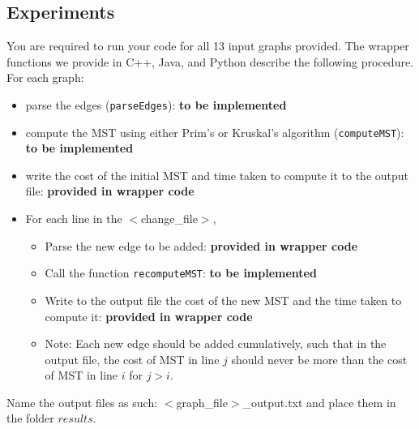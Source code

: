 \documentclass{article}
\begin{document}
\subsection{Experiments}\label{subsec:exp} You are required to run your code
for all 13 input graphs provided. The wrapper functions we provide in C++,
Java, and Python describe the following procedure. For each graph:
\begin{itemize}
\item parse the edges (\texttt{parseEdges}): {\bf to be implemented}
\item compute the MST using either Prim's or Kruskal's algorithm
(\texttt{computeMST}): {\bf to be implemented}
\item write the cost of the initial MST and time taken to compute it to the
output file: {\bf provided in wrapper code}
\item For each line in the $<$change\_file$>$,
    \begin{itemize}
    \item Parse the new edge to be added: {\bf provided in wrapper code}
    \item Call the function \texttt{recomputeMST}: {\bf to be implemented}
    \item Write to the output file the cost of the new MST and the time taken to compute it: {\bf provided in wrapper code}
    \item Note: Each new edge should be added cumulatively, such that in the 
    output file, the cost of MST in line $j$ should never be more than the cost 
    of MST in line $i$ for {$j > i$}.
    \end{itemize}
\end{itemize}
Name the output files as such: $<$graph\_file$>$\_output.txt and place them in the folder $results$.
\end{document}
